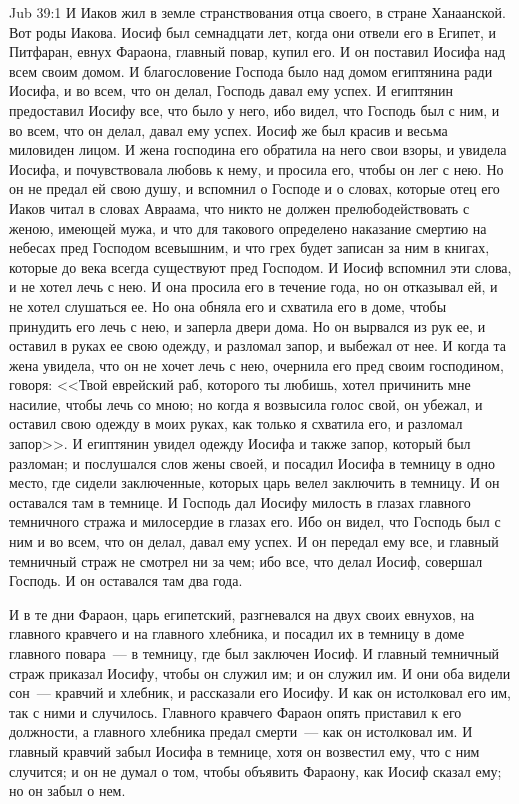 \vs Jub 39:1
И Иаков жил в земле странствования отца своего,
в стране Ханаанской. Вот роды Иакова. Иосиф был
семнадцати лет, когда они отвели его в Египет, и
Питфаран, евнух Фараона, главный повар, купил его.
И он поставил Иосифа над всем своим домом. И
благословение Господа было над домом египтянина
ради Иосифа, и во всем, что он делал, Господь давал
ему успех. И египтянин предоставил Иосифу все,
что было у него, ибо видел, что Господь был с
ним, и во всем, что он делал, давал ему успех. Иосиф
же был красив и весьма миловиден лицом. И жена
господина его обратила на него свои взоры, и
увидела Иосифа, и почувствовала любовь к нему, и
просила его, чтобы он лег с нею. Но он не предал ей
свою душу, и вспомнил о Господе и о словах,
которые отец его Иаков читал в словах Авраама,
что никто не должен прелюбодействовать с женою,
имеющей мужа, и что для такового определено
наказание смертию на небесах пред Господом
всевышним, и что грех будет записан за ним в
книгах, которые до века всегда существуют пред
Господом. И Иосиф вспомнил эти слова, и не хотел
лечь с нею. И она просила его в течение года, но он
отказывал ей, и не хотел слушаться ее. Но она
обняла его и схватила его в доме, чтобы принудить
его лечь с нею, и заперла двери дома. Но он
вырвался из рук ее, и оставил в руках ее свою
одежду, и разломал запор, и выбежал от нее. И когда
та жена увидела, что он не хочет лечь с нею,
очернила его пред своим господином, говоря:
<<Твой еврейский раб, которого ты любишь, хотел
причинить мне насилие, чтобы лечь со мною; но
когда я возвысила голос свой, он убежал, и оставил
свою одежду в моих руках, как только я схватила
его, и разломал запор>>. И египтянин увидел
одежду Иосифа и также запор, который был
разломан; и послушался слов жены своей, и посадил
Иосифа в темницу в одно место, где сидели
заключенные, которых царь велел заключить в
темницу. И он оставался там в темнице. И Господь
дал Иосифу милость в глазах главного темничного
стража и милосердие в глазах его. Ибо он видел,
что Господь был с ним и во всем, что он делал,
давал ему успех. И он передал ему все, и главный
темничный страж не смотрел ни за чем; ибо все, что
делал Иосиф, совершал Господь. И он оставался там
два года.

И в те дни Фараон, царь египетский, разгневался
на двух своих евнухов, на главного кравчего и на
главного хлебника, и посадил их в темницу в доме
главного повара~--- в темницу, где был заключен
Иосиф. И главный темничный страж приказал Иосифу,
чтобы он служил им; и он служил им. И они оба
видели сон~--- кравчий и хлебник, и рассказали его
Иосифу. И как он истолковал его им, так с ними и
случилось. Главного кравчего Фараон опять
приставил к его должности, а главного хлебника
предал смерти~--- как он истолковал им. И главный
кравчий забыл Иосифа в темнице, хотя он возвестил
ему, что с ним случится; и он не думал о том, чтобы
объявить Фараону, как Иосиф сказал ему; но он
забыл о нем.

